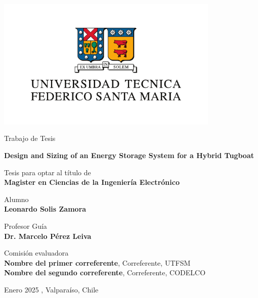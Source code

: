 \begin{titlepage}
    \begin{center}
        \vspace*{0pt}
        \includegraphics[width=0.8\textwidth]{images/logoUSM.pdf}
        
        \Large
        Trabajo de Tesis\\
        \huge
        \vspace{0.5cm}
        
        \textbf{Design and Sizing of an Energy Storage System for a Hybrid Tugboat}\\
        \vspace{1.5cm}
        
        \normalsize
        Tesis para optar al título de\\
        \textbf{Magister en Ciencias de la Ingeniería Electrónico}
        
        \vfill
            
        Alumno\\
        \textbf{Leonardo Solis Zamora}
        \vspace{0.8cm}
            
        Profesor Guía\\
        \textbf{Dr. Marcelo Pérez Leiva}
        \vspace{0.8cm}
        
        Comisión evaluadora\\
        \textbf{Nombre del primer correferente}, Correferente, UTFSM\\
        \textbf{Nombre del segundo correferente}, Correferente, CODELCO
        \vspace{1cm}
        
        Enero 2025		, Valparaíso, Chile
    \end{center}
\end{titlepage}